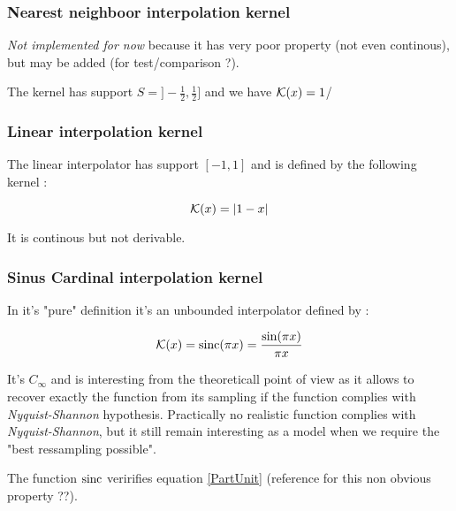 \subsubsection{Nearest neighboor interpolation kernel}

\emph{Not implemented for now} because it has very poor property (not even continous), but may be added 
(for test/comparison ?).

The kernel has support $S=]-\frac{1}{2},\frac{1}{2}]$ and we have $\mathcal K(x)=1$/

\subsubsection{Linear interpolation kernel}
\label{LinearInterp}

The linear interpolator has support $[-1,1]$ and is defined by the following kernel :

\begin{equation}
  \mathcal K(x)= |1-x|
\end{equation}

It is continous but not derivable.


\subsubsection{Sinus Cardinal interpolation kernel}
\label{SinCInterp}


In it's  "pure" definition it's an unbounded interpolator defined by :

\begin{equation}
  \mathcal K(x)= \operatorname{sinc}(\pi x) = \frac{\sin(\pi x)}{\pi x}
\end{equation}

It's $C_{\infty}$ and is interesting from the theoreticall point of view as it allows
to recover exactly the  function from its sampling if the function complies with \emph{Nyquist-Shannon}
hypothesis. Practically no realistic function complies with \emph{Nyquist-Shannon},   but
it still remain interesting as a model when we require the "best ressampling possible".

The function $\operatorname{sinc}$  veririfies equation  \ref{PartUnit} (reference for this non obvious property ??).


